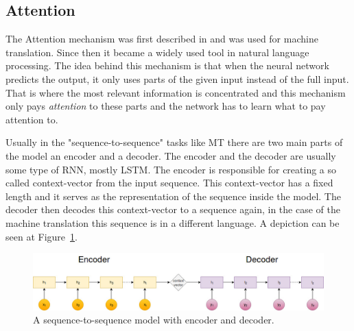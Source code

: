 \subsection{Attention}
The Attention mechanism was first described in \cite{Bahdanau:2015} and was used for machine translation. Since then it became a widely used tool in natural language processing. The idea behind this mechanism is that when the neural network predicts the output, it only uses parts of the given input instead of the full input. That is where the most relevant information is concentrated and this mechanism only pays \textit{attention} to these parts and the network has to learn what to pay attention to.

Usually in the "sequence-to-sequence" tasks like MT there are two main parts of the model an encoder and a decoder. The encoder and the decoder are usually some type of RNN, mostly LSTM. The encoder is responsible for creating a so called context-vector from the input sequence. This context-vector has a fixed length and it serves as the representation of the sequence inside the model. The decoder then decodes this context-vector to a sequence again, in the case of the machine translation this sequence is in a different language. A depiction can be seen at Figure~\ref{fig:seq_to_seq}.
\begin{figure}[!htb]
	\centering
	\includegraphics[scale=0.4]{seq_to_seq.jpg}
	\caption{A sequence-to-sequence model with encoder and decoder.}
	\label{fig:seq_to_seq}
\end{figure}

